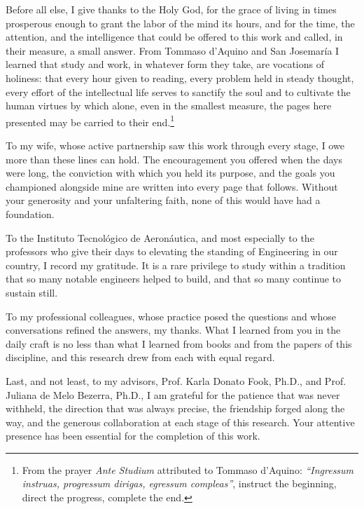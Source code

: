 Before all else, I give thanks to the Holy God, for the grace of living in times prosperous enough to grant the labor of the mind its hours, and for the time, the attention, and the intelligence that could be offered to this work and called, in their measure, a small answer. From Tommaso d'Aquino and San Josemaría I learned that study and work, in whatever form they take, are vocations of holiness: that every hour given to reading, every problem held in steady thought, every effort of the intellectual life serves to sanctify the soul and to cultivate the human virtues by which alone, even in the smallest measure, the pages here presented may be carried to their end.\footnote{From the prayer \emph{Ante Studium} attributed to Tommaso d'Aquino: \emph{``Ingressum instruas, progressum dirigas, egressum compleas''}, instruct the beginning, direct the progress, complete the end.}

To my wife, whose active partnership saw this work through every stage, I owe more than these lines can hold. The encouragement you offered when the days were long, the conviction with which you held its purpose, and the goals you championed alongside mine are written into every page that follows. Without your generosity and your unfaltering faith, none of this would have had a foundation.

To the Instituto Tecnológico de Aeronáutica, and most especially to the professors who give their days to elevating the standing of Engineering in our country, I record my gratitude. It is a rare privilege to study within a tradition that so many notable engineers helped to build, and that so many continue to sustain still.

To my professional colleagues, whose practice posed the questions and whose conversations refined the answers, my thanks. What I learned from you in the daily craft is no less than what I learned from books and from the papers of this discipline, and this research drew from each with equal regard.

Last, and not least, to my advisors, Prof. Karla Donato Fook, Ph.D., and Prof. Juliana de Melo Bezerra, Ph.D., I am grateful for the patience that was never withheld, the direction that was always precise, the friendship forged along the way, and the generous collaboration at each stage of this research. Your attentive presence has been essential for the completion of this work.
